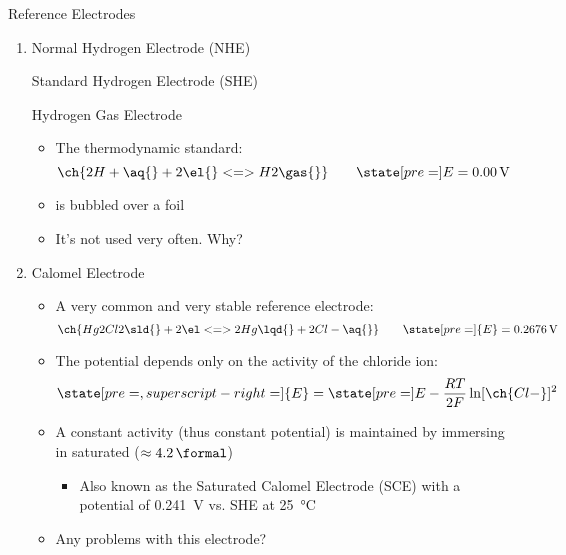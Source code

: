 \documentclass[notes=only]{beamer}
\begin{document}
\begin{frame}[allowframebreaks]{Reference Electrodes}
	\begin{enumerate}
		\item Normal Hydrogen Electrode (NHE)
			
			Standard Hydrogen Electrode (SHE)
				
			Hydrogen Gas Electrode


			\begin{itemize}
				\item The thermodynamic standard:
					\begin{equation*}
						\ch{2 H+ \aq{} + 2 \el{} <=>
						H2\gas{}} \qquad \state[pre=]E =
						\SI{0.00}{\volt}
					\end{equation*}
				\item {} is bubbled over a 
					foil
				\item It's not used very often. Why?
			\end{itemize}

			\framebreak
			
		\item Calomel Electrode
			\begin{itemize}
				\item A very common and very stable reference
					electrode:
					\begin{equation*}
						\ch{Hg2Cl2\sld{} + 2 \el <=> 2
						Hg\lqd{} + 2 Cl- \aq{}} \qquad
						\state[pre=]{E} =
						\SI{0.2676}{\volt}
					\end{equation*}
				\item The potential depends only on the activity
					of the chloride ion:
					\begin{equation*}
						\state[pre=,superscript-right=]{E}
						= \state[pre=]E - \frac{RT}{2F}
						\ln [\ch{Cl-}]^2
					\end{equation*}
				\item A constant activity (thus constant
					potential) is maintained by immersing in
					saturated  ($\approx
					\SI{4.2}{\formal}$)
					\begin{itemize}
						\item Also known as the
							\alert{Saturated Calomel
							Electrode (SCE)} with a
							potential of
							\SI{0.241}{\volt} vs.
							SHE at
							\SI{25}{\celsius}
					\end{itemize}
				\item Any problems with this electrode?
			\end{itemize}


\end{enumerate}
\end{frame}
\end{document}
